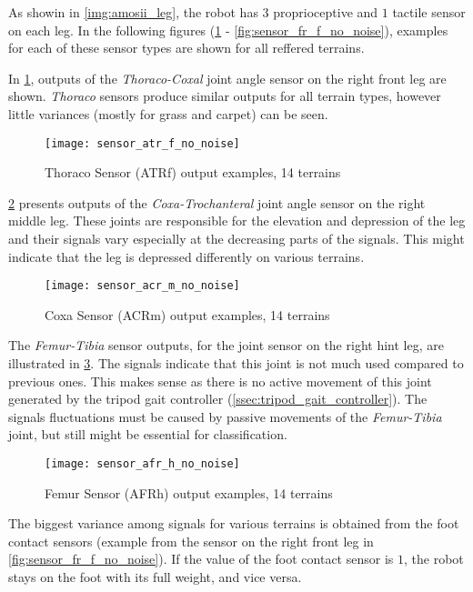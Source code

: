 As showin in \cref{img:amosii_leg}, the robot has $ 3 $ proprioceptive and $ 1 $ tactile sensor on each leg. In the following figures (\cref{fig:sensor_atr_f_no_noise} - \cref{fig:sensor_fr_f_no_noise}), examples for each of these sensor types are shown for all reffered terrains.

In \cref{fig:sensor_atr_f_no_noise}, outputs of the \textit{Thoraco-Coxal} joint angle sensor on the right front leg are shown. \textit{Thoraco} sensors produce similar outputs for all terrain types, however little variances (mostly for grass and carpet) can be seen.

\begin{figure}[H]
  \centering
  \texttt{[image: sensor\_atr\_f\_no\_noise]}
  \caption{Thoraco Sensor (ATRf) output examples, 14 terrains}
  \label{fig:sensor_atr_f_no_noise}
\end{figure}

\cref{fig:sensor_acr_m_no_noise} presents outputs of the \textit{Coxa-Trochanteral} joint angle sensor on the right middle leg. These joints are responsible for the elevation and depression of the leg and their signals vary especially at the decreasing parts of the signals. This might indicate that the leg is depressed differently on various terrains.

\begin{figure}[H]
  \centering
  \texttt{[image: sensor\_acr\_m\_no\_noise]}
  \caption{Coxa Sensor (ACRm) output examples, 14 terrains}
  \label{fig:sensor_acr_m_no_noise}
\end{figure}

The \textit{Femur-Tibia} sensor outputs, for the joint sensor on the right hint leg, are illustrated in \ref{fig:sensor_afr_h_no_noise}. The signals indicate that this joint is not much used compared to previous ones. This makes sense as there is no active movement of this joint generated by the tripod gait controller (\cref{ssec:tripod_gait_controller}). The signals fluctuations must be caused by passive movements of the \textit{Femur-Tibia} joint, but still might be essential for classification.

\begin{figure}[H]
  \centering
  \texttt{[image: sensor\_afr\_h\_no\_noise]}
  \caption{Femur Sensor (AFRh) output examples, 14 terrains}
  \label{fig:sensor_afr_h_no_noise}
\end{figure}

The biggest variance among signals for various terrains is obtained from the foot contact sensors (example from the sensor on the right front leg in \cref{fig:sensor_fr_f_no_noise}). If the value of the foot contact sensor is $ 1 $, the robot stays on the foot with its full weight, and vice versa.

